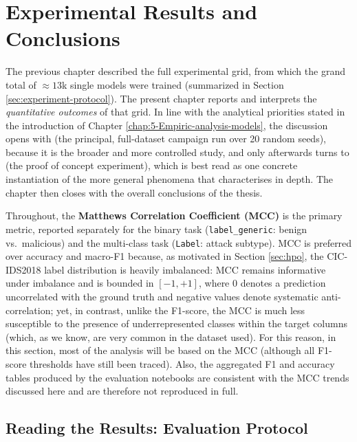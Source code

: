 \documentclass[../main.tex]{subfiles}
\begin{document}
\chapter{Experimental Results and Conclusions}
\label{chap:Empiric-analysis-models}

The previous chapter described the full experimental grid, from which the grand total of $\approx 13$k single models were trained (summarized in Section \ref{sec:experiment-protocol}). The present chapter reports and interprets the \emph{quantitative outcomes} of that grid. In line with the analytical priorities stated in the introduction of Chapter \ref{chap:5-Empiric-analysis-models}, the discussion opens with  (the principal, full-dataset campaign run over 20 random seeds), because it is the broader and more controlled study, and only afterwards turns to  (the proof of concept experiment), which is best read as one concrete instantiation of the more general phenomena that  characterises in depth. The chapter then closes with the overall conclusions of the thesis.

Throughout, the \textbf{Matthews Correlation Coefficient (MCC)} is the primary metric, reported separately for the binary task (\texttt{label\_generic}: benign vs.\ malicious) and the multi-class task (\texttt{Label}: attack subtype). MCC is preferred over accuracy and macro-F1 because, as motivated in Section \ref{sec:hpo}, the CIC-IDS2018 label distribution is heavily imbalanced: MCC remains informative under imbalance and is bounded in $[-1, +1]$, where $0$ denotes a prediction uncorrelated with the ground truth and negative values denote systematic anti-correlation; yet, in contrast, unlike the F1-score, the MCC is much less susceptible to the presence of underrepresented classes within the target columns (which, as we know, are very common in the dataset used). For this reason, in this section, most of the analysis will be based on the MCC (although all F1-score thresholds have still been traced). Also, the aggregated F1 and accuracy tables produced by the evaluation notebooks are consistent with the MCC trends discussed here and are therefore not reproduced in full.

\newpage
\section{Reading the Results: Evaluation Protocol}
\label{sec:res-protocol}
\end{document}
